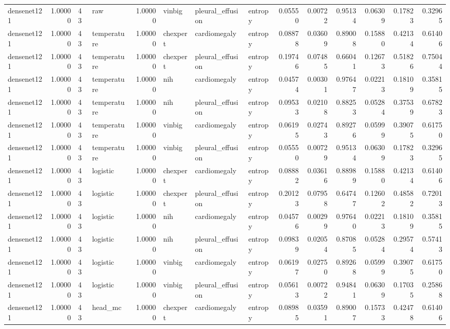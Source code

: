 \begin{tabular}{lrllrlllrrrrrr}
densenet121 & 1.00000 & 43 & raw & 1.00000 & vinbig & pleural\_effusion & entropy & 0.05550 & 0.00722 & 0.95134 & 0.06309 & 0.17823 & 0.32965 \\
densenet121 & 1.00000 & 43 & temperature & 1.00000 & chexpert & cardiomegaly & entropy & 0.08878 & 0.03609 & 0.89008 & 0.15880 & 0.42134 & 0.61406 \\
densenet121 & 1.00000 & 43 & temperature & 1.00000 & chexpert & pleural\_effusion & entropy & 0.19746 & 0.07485 & 0.66041 & 0.12673 & 0.51826 & 0.75044 \\
densenet121 & 1.00000 & 43 & temperature & 1.00000 & nih & cardiomegaly & entropy & 0.04574 & 0.00301 & 0.97647 & 0.02213 & 0.18109 & 0.35815 \\
densenet121 & 1.00000 & 43 & temperature & 1.00000 & nih & pleural\_effusion & entropy & 0.09533 & 0.02108 & 0.88253 & 0.05284 & 0.37539 & 0.67823 \\
densenet121 & 1.00000 & 43 & temperature & 1.00000 & vinbig & cardiomegaly & entropy & 0.06195 & 0.02743 & 0.89276 & 0.05999 & 0.39075 & 0.61750 \\
densenet121 & 1.00000 & 43 & temperature & 1.00000 & vinbig & pleural\_effusion & entropy & 0.05550 & 0.00729 & 0.95134 & 0.06309 & 0.17823 & 0.32965 \\
densenet121 & 1.00000 & 43 & logistic & 1.00000 & chexpert & cardiomegaly & entropy & 0.08882 & 0.03616 & 0.88989 & 0.15880 & 0.42134 & 0.61406 \\
densenet121 & 1.00000 & 43 & logistic & 1.00000 & chexpert & pleural\_effusion & entropy & 0.20123 & 0.07958 & 0.64747 & 0.12602 & 0.48582 & 0.72013 \\
densenet121 & 1.00000 & 43 & logistic & 1.00000 & nih & cardiomegaly & entropy & 0.04576 & 0.00299 & 0.97640 & 0.02213 & 0.18109 & 0.35815 \\
densenet121 & 1.00000 & 43 & logistic & 1.00000 & nih & pleural\_effusion & entropy & 0.09839 & 0.02054 & 0.87085 & 0.05284 & 0.29574 & 0.57413 \\
densenet121 & 1.00000 & 43 & logistic & 1.00000 & vinbig & cardiomegaly & entropy & 0.06197 & 0.02750 & 0.89268 & 0.05999 & 0.39075 & 0.61750 \\
densenet121 & 1.00000 & 43 & logistic & 1.00000 & vinbig & pleural\_effusion & entropy & 0.05613 & 0.00722 & 0.94841 & 0.06309 & 0.17035 & 0.25868 \\
densenet121 & 1.00000 & 43 & head\_mc & 1.00000 & chexpert & cardiomegaly & entropy & 0.08985 & 0.03591 & 0.89007 & 0.15733 & 0.42478 & 0.61406 \\

\end{tabular}
